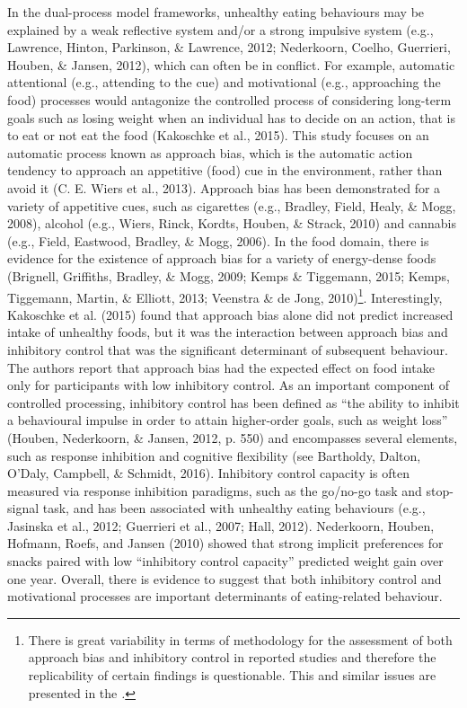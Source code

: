 \documentclass[man,floatsintext]{apa6}
\let\rmarkdownfootnote\footnote%
\def\footnote{\protect\rmarkdownfootnote}
\begin{document}
In the dual-process model frameworks, unhealthy eating behaviours may be explained by a weak reflective system and/or a strong impulsive system (e.g., Lawrence, Hinton, Parkinson, \& Lawrence, 2012; Nederkoorn, Coelho, Guerrieri, Houben, \& Jansen, 2012), which can often be in conflict. For example, automatic attentional (e.g., attending to the cue) and motivational (e.g., approaching the food) processes would antagonize the controlled process of considering long-term goals such as losing weight when an individual has to decide on an action, that is to eat or not eat the food (Kakoschke et al., 2015). This study focuses on an automatic process known as approach bias, which is the automatic action tendency to approach an appetitive (food) cue in the environment, rather than avoid it (C. E. Wiers et al., 2013). Approach bias has been demonstrated for a variety of appetitive cues, such as cigarettes (e.g., Bradley, Field, Healy, \& Mogg, 2008), alcohol (e.g., Wiers, Rinck, Kordts, Houben, \& Strack, 2010) and cannabis (e.g., Field, Eastwood, Bradley, \& Mogg, 2006). In the food domain, there is evidence for the existence of approach bias for a variety of energy-dense foods (Brignell, Griffiths, Bradley, \& Mogg, 2009; Kemps \& Tiggemann, 2015; Kemps, Tiggemann, Martin, \& Elliott, 2013; Veenstra \& de Jong, 2010)\footnote{There is great variability in terms of methodology for the assessment of both approach bias and inhibitory control in reported studies and therefore the replicability of certain findings is questionable. This and similar issues are presented in the \textit{.}}. Interestingly, Kakoschke et al. (2015) found that approach bias alone did not predict increased intake of unhealthy foods, but it was the interaction between approach bias and inhibitory control that was the significant determinant of subsequent behaviour. The authors report that approach bias had the expected effect on food intake only for participants with low inhibitory control. As an important component of controlled processing, inhibitory control has been defined as \enquote{the ability to inhibit a behavioural impulse in order to attain higher-order goals, such as weight loss} (Houben, Nederkoorn, \& Jansen, 2012, p. 550) and encompasses several elements, such as response inhibition and cognitive flexibility (see Bartholdy, Dalton, O'Daly, Campbell, \& Schmidt, 2016). Inhibitory control capacity is often measured via response inhibition paradigms, such as the go/no-go task and stop-signal task, and has been associated with unhealthy eating behaviours (e.g., Jasinska et al., 2012; Guerrieri et al., 2007; Hall, 2012). Nederkoorn, Houben, Hofmann, Roefs, and Jansen (2010) showed that strong implicit preferences for snacks paired with low \enquote{inhibitory control capacity} predicted weight gain over one year. Overall, there is evidence to suggest that both inhibitory control and motivational processes are important determinants of eating-related behaviour.
\end{document}
